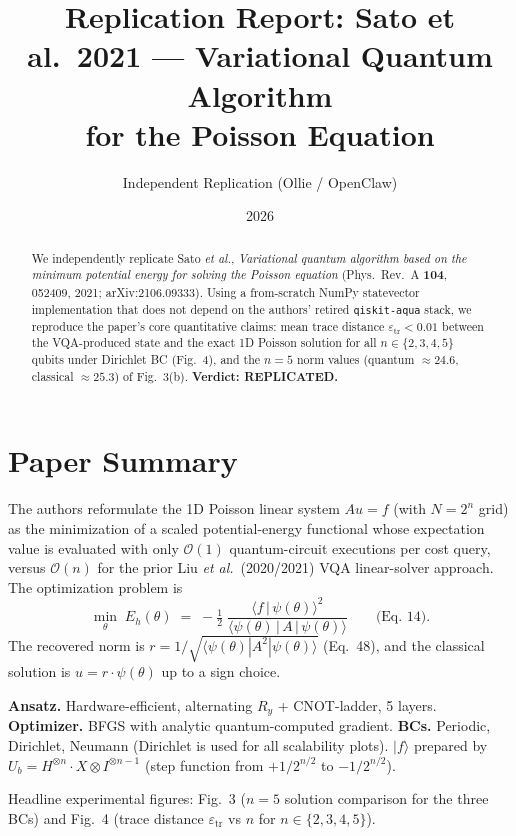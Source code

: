 \documentclass[11pt]{article}
\title{Replication Report: Sato et al.\ 2021 --- Variational Quantum Algorithm\\
for the Poisson Equation}
\author{Independent Replication (Ollie / OpenClaw)}
\date{2026}
\begin{document}
\maketitle

\begin{abstract}
We independently replicate Sato \emph{et al.}, \emph{Variational quantum algorithm
based on the minimum potential energy for solving the Poisson equation}
(Phys.\ Rev.\ A \textbf{104}, 052409, 2021; arXiv:2106.09333). Using a from-scratch
NumPy statevector implementation that does not depend on the authors' retired
\texttt{qiskit-aqua} stack, we reproduce the paper's core quantitative claims:
mean trace distance $\varepsilon_{\text{tr}} < 0.01$ between the VQA-produced state
and the exact 1D Poisson solution for all $n \in \{2,3,4,5\}$ qubits under Dirichlet
BC (Fig.~4), and the $n=5$ norm values (quantum $\approx 24.6$, classical
$\approx 25.3$) of Fig.~3(b). \textbf{Verdict: REPLICATED.}
\end{abstract}

\section{Paper Summary}
The authors reformulate the 1D Poisson linear system $A u = f$ (with $N = 2^n$ grid)
as the minimization of a scaled potential-energy functional whose expectation value
is evaluated with only $\mathcal{O}(1)$ quantum-circuit executions per cost query,
versus $\mathcal{O}(n)$ for the prior Liu \emph{et al.}\ (2020/2021) VQA linear-solver
approach. The optimization problem is
\begin{equation}
  \min_{\theta}\; E_h(\theta) \;=\; -\tfrac{1}{2}\;
      \frac{\langle f \,|\, \psi(\theta) \rangle^{2}}
           {\langle \psi(\theta) \,|\, A \,|\, \psi(\theta) \rangle}
  \qquad \text{(Eq.~14).}
\end{equation}
The recovered norm is $r = 1 / \sqrt{\langle \psi(\theta) | A^{2} | \psi(\theta)\rangle}$
(Eq.~48), and the classical solution is $u = r \cdot \psi(\theta)$ up to a sign choice.

\textbf{Ansatz.} Hardware-efficient, alternating $R_y$ + CNOT-ladder, 5 layers.
\textbf{Optimizer.} BFGS with analytic quantum-computed gradient.
\textbf{BCs.} Periodic, Dirichlet, Neumann (Dirichlet is used for all scalability
plots). $|f\rangle$ prepared by $U_b = H^{\otimes n}\cdot X\otimes I^{\otimes n-1}$
(step function from $+1/2^{n/2}$ to $-1/2^{n/2}$).

Headline experimental figures: Fig.~3 ($n=5$ solution comparison for the three BCs)
and Fig.~4 (trace distance $\varepsilon_{\text{tr}}$ vs $n$ for $n \in \{2,3,4,5\}$).
\end{document}
